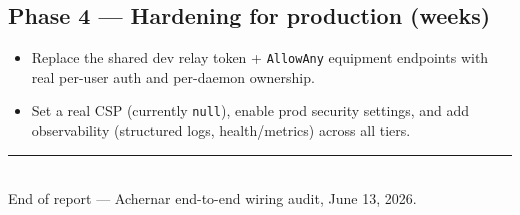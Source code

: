 \documentclass[11pt]{article}
\begin{document}
\subsection*{Phase 4 --- Hardening for production (weeks)}
\begin{itemize}[leftmargin=1.3em]
  \item Replace the shared dev relay token + \texttt{AllowAny} equipment endpoints with real per-user auth
  and per-daemon ownership.
  \item Set a real CSP (currently \texttt{null}), enable prod security settings, and add observability
  (structured logs, health/metrics) across all tiers.
\end{itemize}

\vspace{0.6cm}
\begin{center}
{\color{acnavy}\rule{0.5\linewidth}{0.8pt}}\\[4pt]
{\small\color{acgray} End of report --- Achernar end-to-end wiring audit, June 13, 2026.}
\end{center}
\end{document}
